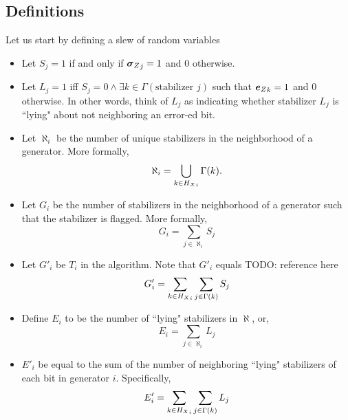 \newcommand{\lyingIndividual}{{L_j}}
\newcommand{\generatorScoreRV}{{G'_i}}
\newcommand{\lyingGenerator}{{E_i}}
\newcommand{\lyingGeneratorScore}{{E'_i}}
\newcommand{\sortIndex}{g_i}
\newcommand{\generatorScoreRVSorted}{{G'_{\sortIndex}}}
\newcommand{\syndromeRV}{S_j}
\newcommand{\generatorScoreOrderStat}{{G'_{(M - i)}}}
\newcommand{\generatorFlaggedStab}{{G_i}}
\newcommand{\generatorStabNeighbors}{{\aleph_i}}
\newcommand{\overcountGenerator}{\mathcal{O}^G_i}
\newcommand{\overcountError}{\mathcal{O}^E_i}

\subsection*{Definitions}
Let us start by defining a slew of random variables
\begin{itemize}
	\item Let $\syndromeRV = 1$ if and only if ${\boldsymbol{\sigma}_Z}_j = 1$ and 0 otherwise.
	\item Let $\lyingIndividual = 1$ iff $\syndromeRV = 0 \wedge \exists k \in \Gamma(\text{stabilizer }j)$ 
	such that ${\boldsymbol{e}_Z}_k = 1$ and 0 otherwise. In other words, think of $\lyingIndividual$ as indicating whether
	stabilizer $\lyingIndividual$ is ``lying" about not neighboring an error-ed bit.
	\item Let $\generatorStabNeighbors$ be the number of unique stabilizers in the neighborhood of a generator. More formally,
	$$
		\generatorStabNeighbors = \bigcup_{k \in \matrixGenerator_i} \Gamma(k).
	$$
	\item Let $\generatorFlaggedStab$ be the number of stabilizers in the neighborhood of a generator such 
	that the stabilizer is flagged. More formally,
	$$
		\generatorFlaggedStab = \sum_{j \in \generatorStabNeighbors} S_j
	$$
	\item Let $\generatorScoreRV$ be $T_i$ in the algorithm. Note that $\generatorScoreRV$ equals TODO: reference here
		$$
			\generatorScoreRV = \sum_{k \in \matrixGenerator_i} \sum_{j \in \Gamma(k)} \syndromeRV 
		$$
	\item Define $\lyingGenerator$ to be the number of ``lying" stabilizers in $\aleph$, or,
	$$
		\lyingGenerator = \sum_{j \in \generatorStabNeighbors} L_j
	$$
	\item $\lyingGeneratorScore$ be equal to the sum of the number of neighboring ``lying" stabilizers of each bit in generator $i$.
	Specifically,
	$$
		\lyingGeneratorScore = \sum_{k \in \matrixGenerator_i} \sum_{j \in \Gamma(k)} \lyingIndividual
	$$

\end{itemize}
